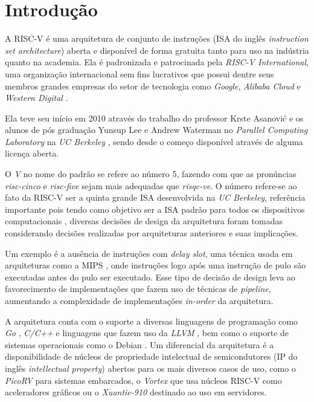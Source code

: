
\chapter{Introdução}
\label{cap:introducao}

A RISC-V é uma arquitetura de conjunto de instruções (ISA do inglês 
\emph{instruction set architecture}) aberta e disponível de forma gratuita 
tanto para uso na indústria quanto na academia. 
Ela é padronizada e patrocinada pela \emph{RISC-V International}, uma organização 
internacional sem fins lucrativos que possui dentre seus membros grandes 
empresas do setor de tecnologia como \emph{Google}, \emph{Alibaba Cloud} e 
\emph{Western Digital} \citep{MEM}.

Ela teve seu início em 2010 através do trabalho do professor Krste Asanović e os 
alunos de pós graduação Yunsup Lee e Andrew Waterman no \emph{Parallel Computing
Laboratory} na \emph{UC Berkeley} \citep{RVH}, sendo desde o começo disponível 
através de alguma licença aberta.

O \emph{V} no nome do padrão se refere ao número 5, fazendo com que as pronúncias
\emph{risc-cinco} e \emph{risc-five} sejam mais adequadas que \emph{risqc-ve}.
O número refere-se ao fato da RISC-V ser a quinta grande ISA desenvolvida na 
\emph{UC Berkeley}, referência importante pois tendo como objetivo ser a ISA 
padrão para todos os dispositivos computacionais \citep{Asanović:EECS-2014-146}, 
diversas decisões de design da arquitetura foram tomadas considerando decisões 
realizadas por arquiteturas anteriores e suas implicações.

Um exemplo é a ausência de instruções com \emph{delay slot}, uma técnica usada 
em arquiteturas como a MIPS \citep{DSTL}, onde instruções logo após uma instrução
de pulo são executadas antes do pulo ser executado. Esse tipo de decisão de design
leva ao favorecimento de implementações que fazem uso de técnicas de \emph{pipeline},
aumentando a complexidade de implementações \emph{in-order} da arquitetura.

A arquitetura conta com o suporte a diversas linguagens de programação como \emph{Go}
\citep{GOL}, \emph{C/C++} \citep{RVGCC} e linguagens que fazem uso da \emph{LLVM} 
\citep{RVLLVM}, bem como o suporte de sistemas operacionais como o Debian \citep{RVDB}. 
Um diferencial da arquitetura é a disponibilidade de núcleos de propriedade intelectual
de semicondutores (IP do inglês \emph{intellectual property}) abertos para os mais 
diversos casos de uso, como o \emph{PicoRV} \citep{PICO} para sistemas embarcados, 
o \emph{Vortex} \citep{elsabbagh2020vortex} que usa núcleos RISC-V como aceleradores 
gráficos ou o \emph{Xuantie-910} \citep{9138983} destinado ao uso em servidores.


